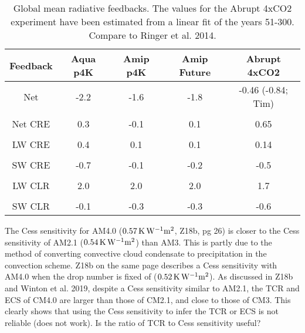 \documentclass[11pt]{article}   	%
\begin{document}
\begin{table}
\begin{center}
\caption{Global mean radiative feedbacks.  The values for the Abrupt 4xCO2 experiment
have been estimated from a linear fit of the years 51-300.  Compare to Ringer et al. 2014.}
    \begin{tabular}{*{5}{c}}
    \hline
    \hline
 Feedback & Aqua p4K & Amip p4K & Amip Future & Abrupt 4xCO2    \\ \hline
    Net          &   -2.2    &  -1.6              & -1.8           &    -0.46 (-0.84; Tim)         \\ 
    \\
    Net CRE      & 0.3      & -0.1            & 0.1           & 0.65   \\  
    \\
    LW CRE       & 0.4       & 0.1            & 0.1           & 0.14    \\  
    \\
    SW CRE      & -0.7       & -0.1          & -0.2          & -0.5              \\  
    \\
    LW CLR       & 2.0       & 2.0             & 2.0           & 1.7             \\  
    \\
    SW CLR      & -0.1      & -0.3            & -0.3          & -0.6                   \\  \hline

    \end{tabular}\par
    \label{tab:lambda}
\end{center}
\end{table}

The Cess sensitivity for AM4.0 ($0.57 \, \rm{K\, W^{-1} m^2}$, Z18b, pg 26) is closer to the Cess sensitivity 
of AM2.1 ($0.54 \, \rm{K\, W^{-1} m^2}$) than AM3.  This is partly due to the method of converting convective cloud condensate to precipitation 
in the convection scheme.   Z18b on the same page describes a Cess sensitivity with AM4.0 when the drop number
is fixed of ($0.52 \, \rm{K\, W^{-1} m^2}$).  As discussed in Z18b and Winton et al. 2019, despite a Cess sensitivity similar to AM2.1, 
the TCR and ECS of CM4.0 are larger than those of CM2.1, and close to those of CM3.   This clearly 
shows that using the Cess sensitivity to infer the TCR or ECS is not reliable (does not work).   Is the ratio of TCR to
Cess sensitivity useful?  
\end{document}
